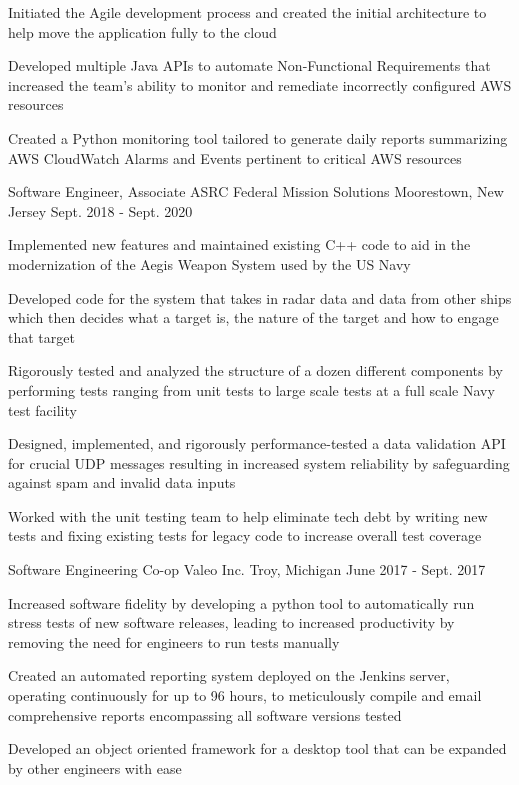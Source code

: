 \begin{cventries}
{\begin{cvitems}
        \item {Initiated the Agile development process and created the initial architecture to help move the application fully to the cloud}
        \item {Developed multiple Java APIs to automate Non-Functional Requirements that increased the team's ability to monitor and remediate incorrectly configured AWS resources}
        \item {Created a Python monitoring tool tailored to generate daily reports summarizing AWS CloudWatch Alarms and Events pertinent to critical AWS resources}
      \end{cvitems} 
    }  
  \cventry
    {Software Engineer, Associate}
    {ASRC Federal Mission Solutions}
    {Moorestown, New Jersey}
    {Sept. 2018 - Sept. 2020}
    {
      \begin{cvitems}
        \item {Implemented new features and maintained existing C++ code to aid in the modernization of the Aegis Weapon System used by the US Navy}
        \item {Developed code for the system that takes in radar data and data from other ships which then decides what a target is, the nature of the target and how to engage that target}
        \item {Rigorously tested and analyzed the structure of a dozen different components by performing tests ranging from unit tests to large scale tests at a full scale Navy test facility}
        \item {Designed, implemented, and rigorously performance-tested a data validation API for crucial UDP messages resulting in increased system reliability by safeguarding against spam and invalid data inputs}
        \item {Worked with the unit testing team to help eliminate tech debt by writing new tests and fixing existing tests for legacy code to increase overall test coverage}
      \end{cvitems} 
    }  
  \cventry
    {Software Engineering Co-op}
    {Valeo Inc.}
    {Troy, Michigan}
    {June 2017 - Sept. 2017}
    {
      \begin{cvitems}
        \item {Increased software fidelity by developing a python tool to automatically run stress tests of new software releases, leading to increased productivity by removing the need for engineers to run tests manually}
        \item {Created an automated reporting system deployed on the Jenkins server, operating continuously for up to 96 hours, to meticulously compile and email comprehensive reports encompassing all software versions tested}
        \item {Developed an object oriented framework for a desktop tool that can be expanded by other engineers with ease}
      \end{cvitems}
    }
\end{cventries}
